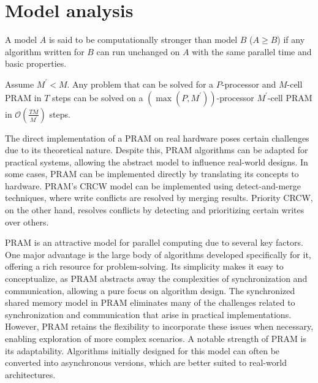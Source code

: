\section{Model analysis}

\begin{definition}
    A model $A$ is said to be computationally stronger than model $B$ ($A \geq B$) if any algorithm written for $B$ can run unchanged on $A$ with the same parallel time and basic properties.
\end{definition}
\begin{lemma}
    Assume $M^\prime < M$. 
    Any problem that can be solved for a $P$-processor and $M$-cell PRAM in $T$ steps can be solved on a $(\max(P, M^\prime))$-processor $M^\prime$-cell PRAM in $\mathcal{O}\left(\frac{TM}{M^\prime}\right)$ steps.
\end{lemma}

The direct implementation of a PRAM on real hardware poses certain challenges due to its theoretical nature. 
Despite this, PRAM algorithms can be adapted for practical systems, allowing the abstract model to influence real-world designs.
In some cases, PRAM can be implemented directly by translating its concepts to hardware. 
PRAM's CRCW model can be implemented using detect-and-merge techniques, where write conflicts are resolved by merging results. 
Priority CRCW, on the other hand, resolves conflicts by detecting and prioritizing certain writes over others. 

PRAM is an attractive model for parallel computing due to several key factors. 
One major advantage is the large body of algorithms developed specifically for it, offering a rich resource for problem-solving. 
Its simplicity makes it easy to conceptualize, as PRAM abstracts away the complexities of synchronization and communication, allowing a pure focus on algorithm design.
The synchronized shared memory model in PRAM eliminates many of the challenges related to synchronization and communication that arise in practical implementations. 
However, PRAM retains the flexibility to incorporate these issues when necessary, enabling exploration of more complex scenarios.
A notable strength of PRAM is its adaptability. 
Algorithms initially designed for this model can often be converted into asynchronous versions, which are better suited to real-world architectures. 